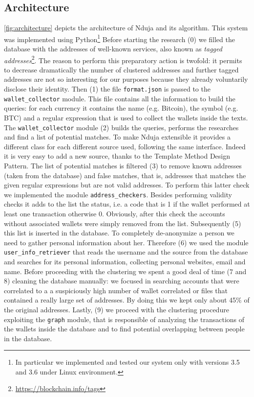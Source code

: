\subsection{Architecture} \label{architecture}
\autoref{fig:architecture} depicts the architecture of Nduja and its algorithm.
This system was implemented using Python\footnote{
	In particular we implemented and tested our system only with versions
	3.5 and 3.6 under Linux environment.}
Before starting the research (0) we filled the database with the addresses of
well-known services, also known as
\emph{tagged addresses}\footnote{\url{https://blockchain.info/tags}}.
The reason to perform this preparatory action 
is twofold: it permits to decrease dramatically the number of
clustered addresses and further tagged addresses are not so
interesting for our purposes because they already voluntarily disclose their
identity.
Then (1) the file \texttt{format.json} is passed to the \verb|wallet_collector|
module. This file contains all the information to build the queries: for each
currency it contains the name (e.g. Bitcoin), the symbol (e.g. BTC) and a
regular expression that is used to collect the wallets inside the texts.
The \verb|wallet_collector| module (2) builds the queries, performs the
researches and find a list of potential matches. To make Nduja extensible it
provides a different class for each different source used, following the same
interface. Indeed it is very easy to add a new source, thanks to the Template
Method Design Pattern.
The list of potential matches is filtered (3) to remove known addresses (taken
from the database) and false matches, that is, addresses that matches the given
regular expressions but are not valid addresses. To perform this latter check
we implemented the module \verb|address_checkers|.
Besides performing validity checks it adds to the list the status, i.e. a
code that is 1 if the wallet performed at least one transaction otherwise 0.
Obviously, after this check the accounts without associated wallets were simply
removed from the list.
Subsequently (5) this list is inserted in the database.
To completely de-anonymize a person we need to gather personal information
about her. Therefore (6) we used the module \verb|user_info_retriever| that
reads the username and the source from the database and searches for its
personal information, collecting personal websites, email and name.
Before proceeding with the clustering we spent a good deal of time (7 and 8)
cleaning the database manually: we focused in searching accounts that were
correlated to a a suspiciously high number of wallet correlated or files that
contained a really large set of addresses. By doing this we kept only about 45\%
of the original addresses.
Lastly, (9) we proceed with the clustering procedure exploiting the \verb|graph|
module, that is responsible of analyzing the transactions of the wallets 
inside the database and to find potential overlapping between people in the
database.

